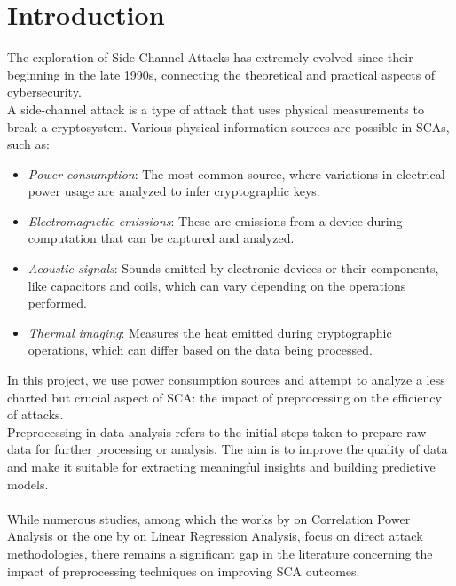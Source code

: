 \documentclass[a4paper,10pt]{article}
\begin{document}
\section{Introduction}
The exploration of Side Channel Attacks has extremely evolved since their beginning in the late 1990s, connecting the theoretical and practical aspects of cybersecurity.\\
\newline
A side-channel attack is a type of attack that uses physical measurements to break a cryptosystem.
Various physical information sources are possible in SCAs, such as:
\begin{itemize}
    \item \textit{Power consumption}: The most common source, where variations in electrical power usage are analyzed to infer cryptographic keys.

    \item \textit{Electromagnetic emissions}: These are emissions from a device during computation that can be captured and analyzed.

    \item \textit{Acoustic signals}: Sounds emitted by electronic devices or their components, like capacitors and coils, which can vary depending on the operations performed.
    
    \item \textit{Thermal imaging}: Measures the heat emitted during cryptographic operations, which can differ based on the data being processed.

\end{itemize}
In this project, we use power consumption sources and attempt to analyze a less charted but crucial aspect of SCA: the impact of preprocessing on the efficiency of attacks. \\
\newline
Preprocessing in data analysis refers to the initial steps taken to prepare raw data for further processing or analysis. 
The aim is to improve the quality of data and make it suitable for extracting meaningful insights and building predictive models.\\
\\
While numerous studies, among which the works by \cite{moussaaliabdellatif:emse-01490735} on Correlation Power Analysis or the one by \cite{Fu2017LinearRS} on Linear Regression Analysis, focus on direct attack methodologies, 
there remains a significant gap in the literature concerning the impact of preprocessing techniques on improving SCA outcomes. \\
\end{document}
